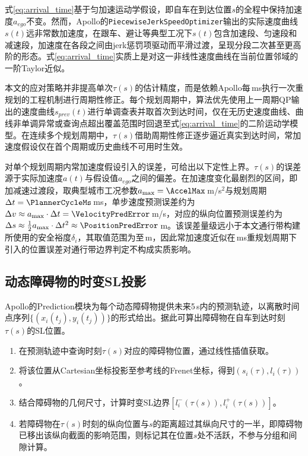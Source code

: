 式\eqref{eq:arrival_time}基于匀加速运动学假设，即自车在到达位置$s$的全程中保持加速度$a_{ego}$不变。然而，Apollo的\texttt{PiecewiseJerkSpeedOptimizer}输出的实际速度曲线$s(t)$远非常数加速度，在跟车、避让等典型工况下$s(t)$包含加速段、匀速段和减速段，加速度在各段之间由jerk惩罚项驱动而平滑过渡，呈现分段二次甚至更高阶的形态。式\eqref{eq:arrival_time}实质上是对这一非线性速度曲线在当前位置邻域的一阶Taylor近似。

本文的应对策略并非提高单次$\tau(s)$的估计精度，而是依赖Apollo每\PlannerCycleMs\,ms执行一次重规划的工程机制进行周期性修正。每个规划周期中，算法优先使用上一周期QP输出的速度曲线$s_{prev}(t)$进行单调查表并取首次到达时间，仅在无历史速度曲线、曲线非单调异常或查询点超出覆盖范围时回退至式\eqref{eq:arrival_time}的二阶运动学模型。在连续多个规划周期中，$\tau(s)$借助周期性修正逐步逼近真实到达时间，常加速度假设仅在首个周期或历史曲线不可用时生效。

对单个规划周期内常加速度假设引入的误差，可给出以下定性上界。$\tau(s)$的误差源于实际加速度$a(t)$与假设值$a_{ego}$之间的偏差。在加速度变化最剧烈的区间，即加减速过渡段，取典型城市工况参数$a_{\max} = \AccelMax$\,m/s$^2$与规划周期$\Delta t = \PlannerCycleMs$\,ms，单步速度预测误差约为$\Delta v \approx a_{\max} \cdot \Delta t = \VelocityPredError$\,m/s，对应的纵向位置预测误差约为$\Delta s \approx \frac{1}{2} a_{\max} \cdot \Delta t^2 \approx \PositionPredError$\,m。该误差量级远小于本文通行带构建所使用的安全裕度$\delta_i$，其取值范围为\DeltaRangeLow 至\DeltaRangeHigh\,m，因此常加速度近似在\PlannerCycleMs\,ms重规划周期下引入的位置误差对通行带边界判定不构成实质影响。

\subsection{动态障碍物的时变SL投影}
\label{sec:time_varying_sl_projection}
Apollo的Prediction模块为每个动态障碍物提供未来5\,s内的预测轨迹，以离散时间点序列$\{(x_i(t_j), y_i(t_j))\}$的形式给出。据此可算出障碍物在自车到达时刻$\tau(s)$的SL位置。

\begin{enumerate}
\item 在预测轨迹中查询时刻$\tau(s)$对应的障碍物位置，通过线性插值获取。

\item 将该位置从Cartesian坐标投影至参考线的Frenet坐标，得到$(s_i(\tau), l_i(\tau))$。

\item 结合障碍物的几何尺寸，计算时变SL边界$[l_i^{-}(\tau(s)), l_i^{+}(\tau(s))]$。

\item 若障碍物在$\tau(s)$时刻的纵向位置与$s$的距离超过其纵向尺寸的一半，即障碍物已移出该纵向截面的影响范围，则标记其在位置$s$处不活跃，不参与分组和间隙计算。
\end{enumerate}

